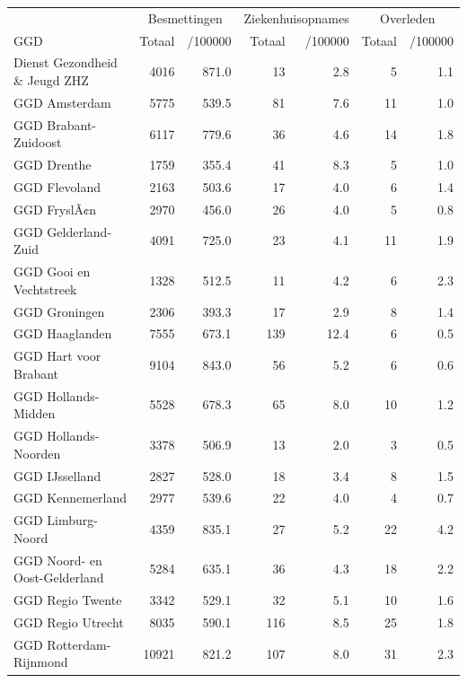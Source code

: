 \documentclass[
  english,
  man,floatsintext]{apa6}
\begin{document}
\begin{table}
\centering\begingroup\fontsize{10}{12}\selectfont

\begin{threeparttable}
\begin{tabular}{lrrrrrr}
\toprule
\multicolumn{1}{c}{ } & \multicolumn{2}{c}{Besmettingen} & \multicolumn{2}{c}{Ziekenhuisopnames} & \multicolumn{2}{c}{Overleden} \\
\cmidrule(l{3pt}r{3pt}){2-3} \cmidrule(l{3pt}r{3pt}){4-5} \cmidrule(l{3pt}r{3pt}){6-7}
GGD & Totaal & /100000 & Totaal & /100000 & Totaal & /100000\\
\midrule
Dienst Gezondheid \& Jeugd ZHZ & 4016 & 871.0 & 13 & 2.8 & 5 & 1.1\\
GGD Amsterdam & 5775 & 539.5 & 81 & 7.6 & 11 & 1.0\\
GGD Brabant-Zuidoost & 6117 & 779.6 & 36 & 4.6 & 14 & 1.8\\
GGD Drenthe & 1759 & 355.4 & 41 & 8.3 & 5 & 1.0\\
GGD Flevoland & 2163 & 503.6 & 17 & 4.0 & 6 & 1.4\\
GGD FryslÃ¢n & 2970 & 456.0 & 26 & 4.0 & 5 & 0.8\\
GGD Gelderland-Zuid & 4091 & 725.0 & 23 & 4.1 & 11 & 1.9\\
GGD Gooi en Vechtstreek & 1328 & 512.5 & 11 & 4.2 & 6 & 2.3\\
GGD Groningen & 2306 & 393.3 & 17 & 2.9 & 8 & 1.4\\
GGD Haaglanden & 7555 & 673.1 & 139 & 12.4 & 6 & 0.5\\
GGD Hart voor Brabant & 9104 & 843.0 & 56 & 5.2 & 6 & 0.6\\
GGD Hollands-Midden & 5528 & 678.3 & 65 & 8.0 & 10 & 1.2\\
GGD Hollands-Noorden & 3378 & 506.9 & 13 & 2.0 & 3 & 0.5\\
GGD IJsselland & 2827 & 528.0 & 18 & 3.4 & 8 & 1.5\\
GGD Kennemerland & 2977 & 539.6 & 22 & 4.0 & 4 & 0.7\\
GGD Limburg-Noord & 4359 & 835.1 & 27 & 5.2 & 22 & 4.2\\
GGD Noord- en Oost-Gelderland & 5284 & 635.1 & 36 & 4.3 & 18 & 2.2\\
GGD Regio Twente & 3342 & 529.1 & 32 & 5.1 & 10 & 1.6\\
GGD Regio Utrecht & 8035 & 590.1 & 116 & 8.5 & 25 & 1.8\\
GGD Rotterdam-Rijnmond & 10921 & 821.2 & 107 & 8.0 & 31 & 2.3\\

\end{tabular}
\end{threeparttable}
\end{table}
\end{document}
